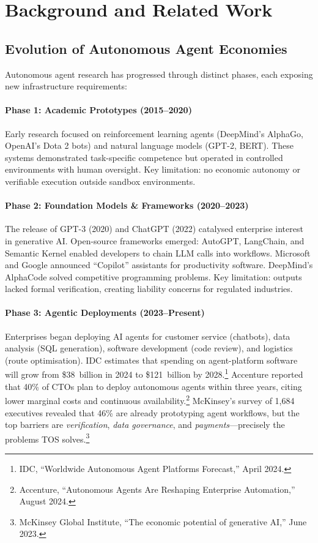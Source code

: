 \documentclass[11pt]{article}
\begin{document}
\section{Background and Related Work}
\subsection{Evolution of Autonomous Agent Economies}
Autonomous agent research has progressed through distinct phases, each exposing new infrastructure requirements:

\paragraph{Phase 1: Academic Prototypes (2015--2020)} Early research focused on reinforcement learning agents (DeepMind's AlphaGo, OpenAI's Dota 2 bots) and natural language models (GPT-2, BERT). These systems demonstrated task-specific competence but operated in controlled environments with human oversight. Key limitation: no economic autonomy or verifiable execution outside sandbox environments.

\paragraph{Phase 2: Foundation Models \& Frameworks (2020--2023)} The release of GPT-3 (2020) and ChatGPT (2022) catalysed enterprise interest in generative AI. Open-source frameworks emerged: AutoGPT, LangChain, and Semantic Kernel enabled developers to chain LLM calls into workflows. Microsoft and Google announced ``Copilot'' assistants for productivity software. DeepMind's AlphaCode solved competitive programming problems. Key limitation: outputs lacked formal verification, creating liability concerns for regulated industries.

\paragraph{Phase 3: Agentic Deployments (2023--Present)} Enterprises began deploying AI agents for customer service (chatbots), data analysis (SQL generation), software development (code review), and logistics (route optimisation). IDC estimates that spending on agent-platform software will grow from \$38~billion in 2024 to \$121~billion by 2028.\footnote{IDC, ``Worldwide Autonomous Agent Platforms Forecast,'' April 2024.} Accenture reported that 40\% of CTOs plan to deploy autonomous agents within three years, citing lower marginal costs and continuous availability.\footnote{Accenture, ``Autonomous Agents Are Reshaping Enterprise Automation,'' August 2024.} McKinsey's survey of 1,684 executives revealed that 46\% are already prototyping agent workflows, but the top barriers are \emph{verification}, \emph{data governance}, and \emph{payments}---precisely the problems TOS solves.\footnote{McKinsey Global Institute, ``The economic potential of generative AI,'' June 2023.}
\end{document}

